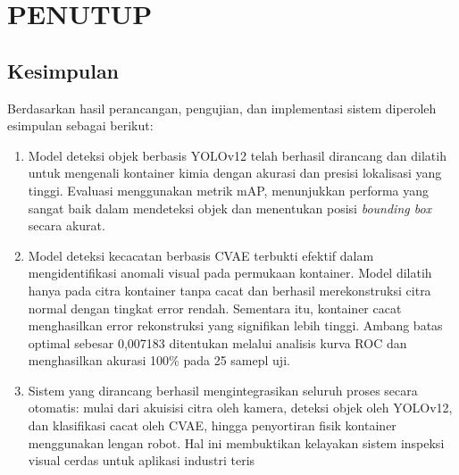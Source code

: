 \chapter{PENUTUP}
\section{Kesimpulan}
\noindent
Berdasarkan hasil perancangan, pengujian, dan implementasi sistem
diperoleh esimpulan sebagai berikut:
\begin{enumerate}
  \item Model deteksi objek berbasis YOLOv12 telah berhasil dirancang
    dan dilatih untuk mengenali kontainer kimia dengan akurasi dan
    presisi lokalisasi yang tinggi. Evaluasi menggunakan metrik mAP,
    menunjukkan performa yang sangat baik
    dalam mendeteksi objek dan menentukan posisi \textit{bounding
    box} secara akurat.
  \item Model deteksi kecacatan berbasis CVAE terbukti efektif dalam
    mengidentifikasi anomali visual pada permukaan kontainer. Model
    dilatih hanya pada citra kontainer tanpa cacat dan berhasil
    merekonstruksi citra normal dengan tingkat error rendah.
    Sementara itu, kontainer cacat menghasilkan error rekonstruksi
    yang signifikan lebih tinggi. Ambang batas optimal sebesar
    0,007183 ditentukan melalui analisis kurva ROC dan menghasilkan
    akurasi 100\% pada 25 samepl uji.
  \item Sistem yang dirancang berhasil mengintegrasikan seluruh
    proses secara otomatis: mulai dari akuisisi citra oleh kamera,
    deteksi objek oleh YOLOv12, dan klasifikasi cacat oleh CVAE, hingga
    penyortiran fisik kontainer menggunakan lengan robot. Hal ini
    membuktikan kelayakan sistem inspeksi visual cerdas untuk
    aplikasi industri teris
\end{enumerate}

\vspace{1em}

